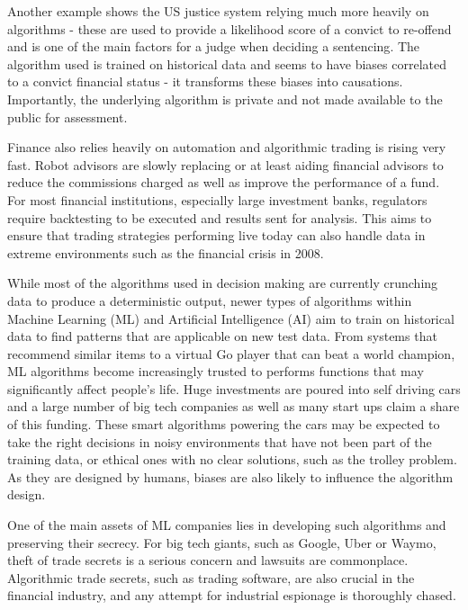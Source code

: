 \documentclass[proposal]{softeng}
\begin{document}
Another example shows the US justice system relying much more heavily on algorithms - these are used to provide a likelihood score of a convict to re-offend and is one of the main factors for a judge when deciding a sentencing\cite{jail}. The algorithm used is trained on historical data and seems to have biases correlated to a convict financial status - it transforms these biases into causations. Importantly, the underlying algorithm is private and not made available to the public for assessment.

Finance also relies heavily on automation and algorithmic trading is rising very fast. Robot advisors are slowly replacing or at least aiding financial advisors to reduce the commissions charged as well as improve the performance of a fund\cite{robot}. For most financial institutions, especially large investment banks, regulators require backtesting to be executed and results sent for analysis\cite{backtesting}. This aims to ensure that trading strategies performing live today can also handle data in extreme environments such as the financial crisis in 2008.

While most of the algorithms used in decision making are currently crunching data to produce a deterministic output, newer types of algorithms within Machine Learning (ML) and Artificial Intelligence (AI) aim to train on historical data to find patterns that are applicable on new test data. From systems that recommend similar items to a virtual Go player that can beat a world champion\cite{alphago}, ML algorithms become increasingly trusted to performs functions that may significantly affect people's life. Huge investments are poured into self driving cars and a large number of big tech companies as well as many start ups\cite{autonomous} claim a share of this funding. These smart algorithms powering the cars may be expected to take the right decisions in noisy environments that have not been part of the training data, or ethical ones with no clear solutions, such as the trolley problem\cite{trolley}. As they are designed by humans, biases are also likely to influence the algorithm design.

One of the main assets of ML companies lies in developing such algorithms and preserving their secrecy. For big tech giants, such as Google, Uber or Waymo, theft of trade secrets is a serious concern and lawsuits are commonplace\cite{stealuber,waymo}. Algorithmic trade secrets, such as trading software, are also crucial in the financial industry, and any attempt for industrial espionage is thoroughly chased\cite{jeopardy}.
\end{document}
